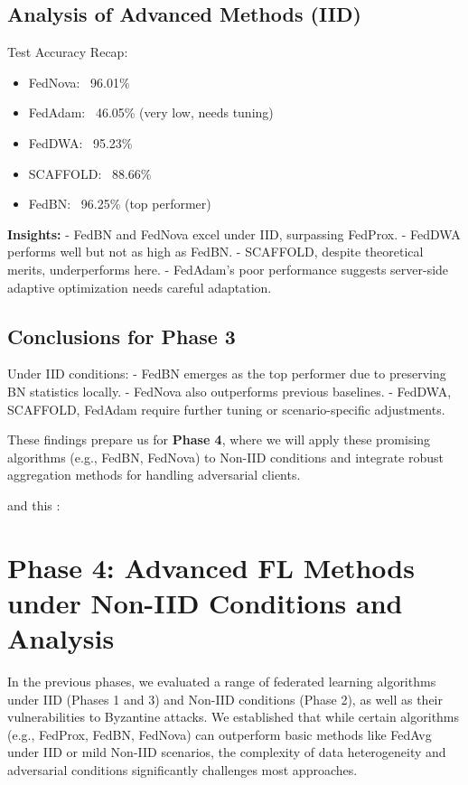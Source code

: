 \documentclass[12pt,a4paper]{report}
\begin{document}
\section{Analysis of Advanced Methods (IID)}

Test Accuracy Recap:
\begin{itemize}
	\item FedNova: ~96.01\%
	\item FedAdam: ~46.05\% (very low, needs tuning)
	\item FedDWA: ~95.23\%
	\item SCAFFOLD: ~88.66\%
	\item FedBN: ~96.25\% (top performer)
\end{itemize}

\textbf{Insights:}
- FedBN and FedNova excel under IID, surpassing FedProx.
- FedDWA performs well but not as high as FedBN.
- SCAFFOLD, despite theoretical merits, underperforms here.
- FedAdam’s poor performance suggests server-side adaptive optimization needs careful adaptation.

\section{Conclusions for Phase 3}

Under IID conditions:
- FedBN emerges as the top performer due to preserving BN statistics locally.
- FedNova also outperforms previous baselines.
- FedDWA, SCAFFOLD, FedAdam require further tuning or scenario-specific adjustments.

These findings prepare us for \textbf{Phase 4}, where we will apply these promising algorithms (e.g., FedBN, FedNova) to Non-IID conditions and integrate robust aggregation methods for handling adversarial clients.

 and this :
\chapter{Phase 4: Advanced FL Methods under Non-IID Conditions and Analysis}

In the previous phases, we evaluated a range of federated learning algorithms under IID (Phases 1 and 3) and Non-IID conditions (Phase 2), as well as their vulnerabilities to Byzantine attacks. We established that while certain algorithms (e.g., FedProx, FedBN, FedNova) can outperform basic methods like FedAvg under IID or mild Non-IID scenarios, the complexity of data heterogeneity and adversarial conditions significantly challenges most approaches.
\end{document}
